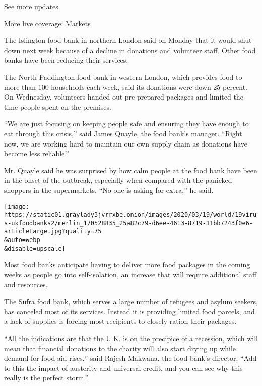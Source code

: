 \href{https://www.nytimes3xbfgragh.onion/2020/09/11/world/covid-19-coronavirus.html?action=click\&pgtype=Article\&state=default\&region=MAIN_CONTENT_1\&context=storylines_live_updates}{See
more updates}

More live coverage:
\href{https://www.nytimes3xbfgragh.onion/live/2020/09/11/business/stock-market-today-coronavirus?action=click\&pgtype=Article\&state=default\&region=MAIN_CONTENT_1\&context=storylines_live_updates}{Markets}

The Islington food bank in northern London said on Monday that it would
shut down next week because of a decline in donations and volunteer
staff. Other food banks have been reducing their services.

The North Paddington food bank in western London, which provides food to
more than 100 households each week, said its donations were down 25
percent. On Wednesday, volunteers handed out pre-prepared packages and
limited the time people spent on the premises.

``We are just focusing on keeping people safe and ensuring they have
enough to eat through this crisis,'' said James Quayle, the food bank's
manager. ``Right now, we are working hard to maintain our own supply
chain as donations have become less reliable.''

Mr. Quayle said he was surprised by how calm people at the food bank
have been in the onset of the outbreak, especially when compared with
the panicked shoppers in the supermarkets. ``No one is asking for
extra,'' he said.

\texttt{[image: https://static01.graylady3jvrrxbe.onion/images/2020/03/19/world/19virus-ukfoodbanks2/merlin\_170528835\_25a82c79-d6ee-4613-8719-11bb7243f0e6-articleLarge.jpg?quality=75\\\&auto=webp\\\&disable=upscale]}

Most food banks anticipate having to deliver more food packages in the
coming weeks as people go into self-isolation, an increase that will
require additional staff and resources.

The Sufra food bank, which serves a large number of refugees and asylum
seekers, has canceled most of its services. Instead it is providing
limited food parcels, and a lack of supplies is forcing most recipients
to closely ration their packages.

``All the indications are that the U.K. is on the precipice of a
recession, which will mean that financial donations to the charity will
also start drying up while demand for food aid rises,'' said Rajesh
Makwana, the food bank's director. ``Add to this the impact of austerity
and universal credit, and you can see why this really is the perfect
storm.''


